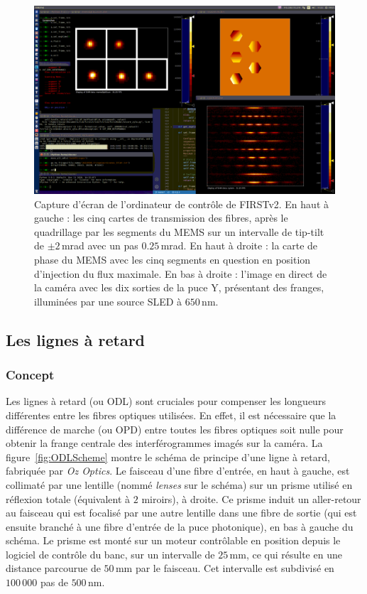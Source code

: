 \begin{figure}[ht!]
    \centering
    \includegraphics[width=\figwidth]{Figure_Chap2/20220505_5TC_AY_InjectionOpti_Fringes_Meudon.png}
    \caption[Capture d'écran de l'ordinateur de contrôle de FIRSTv2 montrant une optimisation de l'injection et les interférogrammes.]{Capture d'écran de l'ordinateur de contrôle de FIRSTv2. En haut à gauche : les cinq cartes de transmission des fibres, après le quadrillage par les segments du MEMS sur un intervalle de tip-tilt de $\pm 2 \,$mrad avec un pas $0.25 \,$mrad. En haut à droite : la carte de phase du MEMS avec les cinq segments en question en position d'injection du flux maximale. En bas à droite : l'image en direct de la caméra avec les dix sorties de la puce Y, présentant des franges, illuminées par une source SLED à $650 \,$nm.}
    \label{fig:OptiInj}
\end{figure}


\subsection{Les lignes à retard}

\subsubsection{Concept}

Les lignes à retard (ou \acrfull{ODL}) sont cruciales pour compenser les longueurs différentes entre les fibres optiques utilisées. En effet, il est nécessaire que la différence de marche (ou \acrfull{OPD}) entre toutes les fibres optiques soit nulle pour obtenir la frange centrale des interférogrammes imagés sur la caméra. La figure~\ref{fig:ODLScheme} montre le schéma de principe d'une ligne à retard, fabriquée par \textit{Oz Optics}. Le faisceau d'une fibre d'entrée, en haut à gauche, est collimaté par une lentille (nommé \textit{lenses} sur le schéma) sur un prisme utilisé en réflexion totale (équivalent à $2$ miroirs), à droite. Ce prisme induit un aller-retour au faisceau qui est focalisé par une autre lentille dans une fibre de sortie (qui est ensuite branché à une fibre d'entrée de la puce photonique), en bas à gauche du schéma. Le prisme est monté sur un moteur contrôlable en position depuis le logiciel de contrôle du banc, sur un intervalle de $25 \,$mm, ce qui résulte en une distance parcourue de $50 \,$mm par le faisceau. Cet intervalle est subdivisé en $100\,000$ pas de $500 \,$nm.

